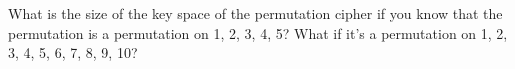   What is the size of the key space of the permutation cipher
  if you know that the permutation is a permutation on 1, 2, 3, 4, 5?
  What if it's a permutation on 1, 2, 3, 4, 5, 6, 7, 8, 9, 10?
